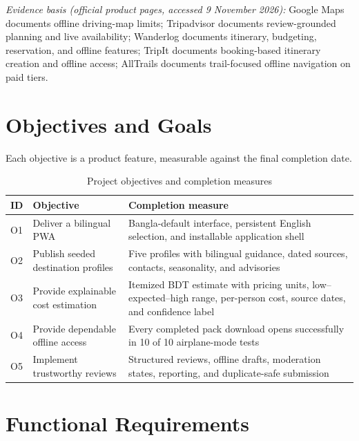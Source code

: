 \documentclass[11pt,a4paper]{article}
\newcommand{\hd}[1]{\textbf{#1}}
\begin{document}
{\footnotesize\textit{Evidence basis (official product pages, accessed 9 November 2026):} Google Maps documents offline driving-map limits; Tripadvisor documents review-grounded planning and live availability; Wanderlog documents itinerary, budgeting, reservation, and offline features; TripIt documents booking-based itinerary creation and offline access; AllTrails documents trail-focused offline navigation on paid tiers.}
\clearpage

\section{Objectives and Goals}
Each objective is a product feature, measurable against the final completion date.

\begin{table}[H]
\centering
\caption{Project objectives and completion measures}\label{tab:objectives}
\begin{tabular}{L{10mm}L{46mm}L{88mm}}
\toprule
\hd{ID} & \hd{Objective} & \hd{Completion measure} \\
\midrule
O1 & Deliver a bilingual PWA & Bangla-default interface, persistent English selection, and installable application shell \\
O2 & Publish seeded destination profiles & Five profiles with bilingual guidance, dated sources, contacts, seasonality, and advisories \\
O3 & Provide explainable cost estimation & Itemized BDT estimate with pricing units, low--expected--high range, per-person cost, source dates, and confidence label \\
O4 & Provide dependable offline access & Every completed pack download opens successfully in 10 of 10 airplane-mode tests \\
O5 & Implement trustworthy reviews & Structured reviews, offline drafts, moderation states, reporting, and duplicate-safe submission \\
\bottomrule
\end{tabular}
\end{table}

\section{Functional Requirements}
\end{document}
